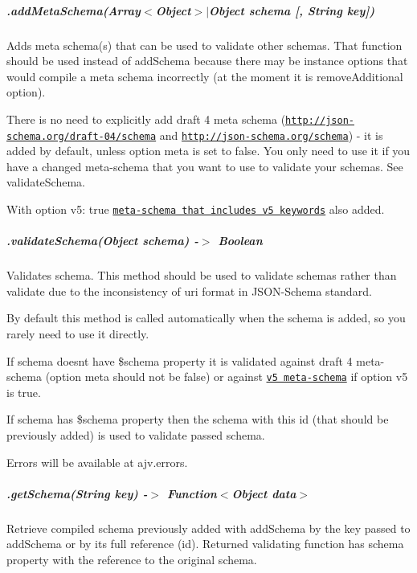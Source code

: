 \subparagraph*{.add\+Meta\+Schema(Array$<$Object$>$$\vert$\+Object schema \mbox{[}, String key\mbox{]})}

Adds meta schema(s) that can be used to validate other schemas. That function should be used instead of {\ttfamily add\+Schema} because there may be instance options that would compile a meta schema incorrectly (at the moment it is {\ttfamily remove\+Additional} option).

There is no need to explicitly add draft 4 meta schema (\href{http://json-schema.org/draft-04/schema}{\tt http\+://json-\/schema.\+org/draft-\/04/schema} and \href{http://json-schema.org/schema}{\tt http\+://json-\/schema.\+org/schema}) -\/ it is added by default, unless option {\ttfamily meta} is set to {\ttfamily false}. You only need to use it if you have a changed meta-\/schema that you want to use to validate your schemas. See {\ttfamily validate\+Schema}.

With option {\ttfamily v5\+: true} \href{https://raw.githubusercontent.com/epoberezkin/ajv/master/lib/refs/json-schema-v5.json}{\tt meta-\/schema that includes v5 keywords} also added.

\subparagraph*{\label{_api-validateschema}%
.validate\+Schema(\+Object schema) -\/$>$ Boolean}

Validates schema. This method should be used to validate schemas rather than {\ttfamily validate} due to the inconsistency of {\ttfamily uri} format in J\+S\+O\+N-\/\+Schema standard.

By default this method is called automatically when the schema is added, so you rarely need to use it directly.

If schema doesn\textquotesingle{}t have {\ttfamily \$schema} property it is validated against draft 4 meta-\/schema (option {\ttfamily meta} should not be false) or against \href{https://raw.githubusercontent.com/epoberezkin/ajv/master/lib/refs/json-schema-v5.json#}{\tt v5 meta-\/schema} if option {\ttfamily v5} is true.

If schema has {\ttfamily \$schema} property then the schema with this id (that should be previously added) is used to validate passed schema.

Errors will be available at {\ttfamily ajv.\+errors}.

\subparagraph*{.get\+Schema(\+String key) -\/$>$ Function$<$Object data$>$}

Retrieve compiled schema previously added with {\ttfamily add\+Schema} by the key passed to {\ttfamily add\+Schema} or by its full reference (id). Returned validating function has {\ttfamily schema} property with the reference to the original schema.

